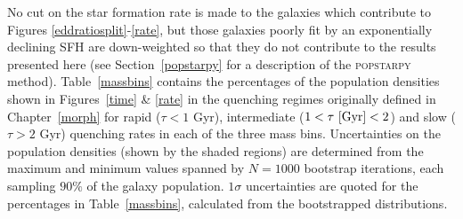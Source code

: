 No cut on the star formation rate is made to the galaxies which contribute to Figures \ref{eddratiosplit}-\ref{rate}, but those galaxies poorly fit by an exponentially declining SFH are down-weighted so that they do not contribute to the results presented here (see Section~\ref{popstarpy} for a description of the \textsc{popstarpy} method). Table~\ref{massbins} contains the percentages of the population densities shown in Figures~\ref{time} \& \ref{rate} in the quenching regimes originally defined in Chapter~\ref{morph} for rapid ($\tau < 1$ Gyr), intermediate ($1 < \tau ~\rm{[Gyr]} < 2$) and slow ($\tau > 2$ Gyr) quenching rates in each of the three mass bins. Uncertainties on the population densities (shown by the shaded regions) are determined from the maximum and minimum values spanned by $N = 1000$ bootstrap iterations, each sampling $90\%$ of the galaxy population. $1\sigma$ uncertainties are quoted for the percentages in Table~\ref{massbins}, calculated from the bootstrapped distributions.


